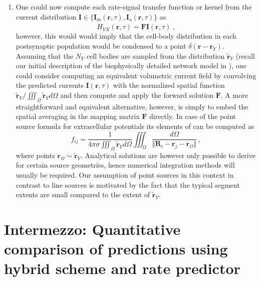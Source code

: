 \begin{enumerate}
\item One could now compute each rate-signal transfer function or kernel from the current distribution
$\mathbf{I} \in \{ \mathbf{I}_\mathrm{m}(\mathbf{r}, \tau), \mathbf{I}_\mathrm{a}(\mathbf{r}, \tau) \}$ as
\begin{equation}
\hat{H}_{YX}(\mathbf{r}, \tau) = \mathbf{F}\mathbf{I}(\mathbf{r}, \tau) ~,
\end{equation}
however, this would would imply that the cell-body distribution in each postsynaptic population would be condensed to a point $\delta(\mathbf{r} - \mathbf{r}_Y)$.
Assuming that the $N_Y$ cell bodies are sampled from the distribution $\widetilde{\mathbf{r}}_Y$
(recall our initial description of the biophysically detailed network model in ),
one could consider computing an equivalent volumetric current field by convolving the predicted currents $\mathbf{I}(\mathbf{r}, \tau)$ with the normalized spatial function
$\widetilde{\mathbf{r}}_Y / \iiint_\Omega \widetilde{\mathbf{r}}_Y d\Omega$
and then compute and apply the forward solution $\mathbf{F}$.
A more straightforward and equivalent alternative, however,
is simply to embed the spatial averaging in the mapping matrix $\mathbf{F}$ directly.
In case of the point source formula for extracellular potentials its elements of can be computed as
\begin{equation}
f_{ij} = \frac{1}{4 \pi \sigma \iiint_\Omega \widetilde{\mathbf{r}}_Y d\Omega}
	\iiint_\Omega \frac{d\Omega}{\Vert \mathbf{R}_i - \mathbf{r}_j - \mathbf{r}_\Omega \Vert}~, 
\end{equation}
where points $\mathbf{r}_\Omega \sim \widetilde{\mathbf{r}}_Y$. 
Analytical solutions are however only possible to derive for certain source geometries, 
hence numerical integration methods will usually be required. 
Our assumption of point sources in this context in contrast to line sources is motivated by the fact that the typical segment extents are small compared to the extent of $\widetilde{\mathbf{r}}_Y$.

\end{enumerate}


\section{Intermezzo: Quantitative comparison of predictions using hybrid scheme and rate predictor}
\label{sec:Schemes:comparison}

